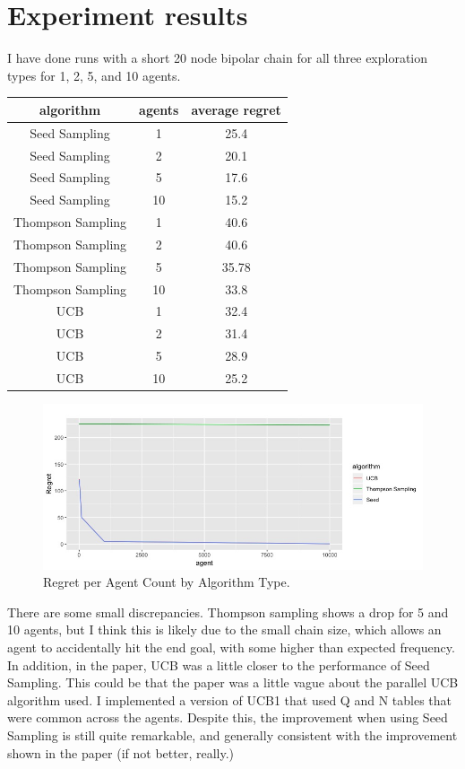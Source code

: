 \documentclass{article}
\begin{document}
\section{Experiment results}
I have done runs with a short 20 node bipolar chain for all three exploration types for 1, 2, 5, and 10 agents.
\begin{tabular}{|c|c|c|}
\hline 
algorithm & agents & average regret \\ 
\hline 
Seed Sampling & 1 & 25.4 \\ 
\hline 
Seed Sampling&2&20.1 \\ 
\hline 
Seed Sampling&5&17.6 \\ 
\hline 
Seed Sampling&10&15.2 \\ 
\hline 
Thompson Sampling&1&40.6 \\ 
\hline 
Thompson Sampling&2&40.6  \\ 
\hline 
Thompson Sampling&5&35.78 \\ 
\hline 
Thompson Sampling&10&33.8  \\ 
\hline 
UCB&1&32.4  \\ 
\hline 
UCB&2&31.4 \\ 
\hline 
UCB&5&28.9 \\ 
\hline 
UCB&10&25.2 \\ 
\hline 
\end{tabular} 
\begin{figure}[htbp!]
  \centering
\includegraphics[scale=.6]{results_pre.jpeg}

  \caption{Regret per Agent Count by Algorithm Type.}
 \label{fig:bipolarregretperagentbyalgo}
\end{figure}
There are some small discrepancies. Thompson sampling shows a drop for 5 and 10 agents, but I think this is likely due to the small chain size, which allows an agent to accidentally hit the end goal, with some higher than expected frequency. In addition, in the paper, UCB was a little closer to the performance of Seed Sampling. This could be that the paper was a little vague about the parallel UCB algorithm used. I implemented a version of UCB1 that used Q and N tables that were common across the agents. Despite this, the improvement when using Seed Sampling is still quite remarkable, and generally consistent with the improvement shown in the paper (if not better, really.)
\end{document}
